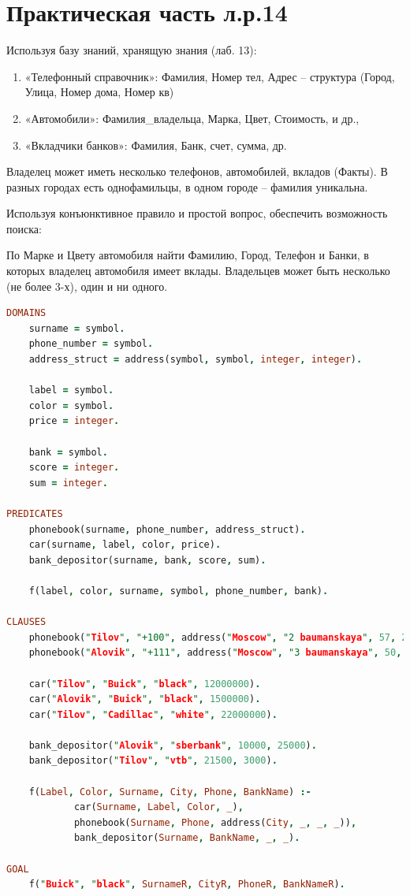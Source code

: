 \documentclass[a4paper,oneside,12pt]{extreport}
\begin{document}
\newpage

\section*{Практическая часть л.р.14}

\begin{task}
    Используя базу знаний, хранящую знания (лаб. 13):
    \begin{enumerate}
        \item «Телефонный справочник»: Фамилия, Номер  тел, Адрес – структура (Город, Улица, Номер дома, Номер кв)
        \item «Автомобили»: Фамилия\_владельца, Марка, Цвет, Стоимость, и др.,
        \item «Вкладчики банков»: Фамилия, Банк, счет, сумма, др.
    \end{enumerate}
    Владелец может иметь несколько телефонов, автомобилей, вкладов (Факты).
    В разных городах есть однофамильцы, в одном городе – фамилия уникальна.

    Используя конъюнктивное правило и простой вопрос, обеспечить возможность
    поиска:

    По Марке и Цвету автомобиля найти Фамилию, Город, Телефон и Банки, в которых
    владелец автомобиля имеет вклады.
    Владельцев может быть несколько (не более 3-х), один и ни одного.
    \begin{lstlisting}[language=Prolog]
DOMAINS 
    surname = symbol.
    phone_number = symbol.
    address_struct = address(symbol, symbol, integer, integer).

    label = symbol.
    color = symbol.
    price = integer.
    
    bank = symbol.
    score = integer.
    sum = integer.

PREDICATES
    phonebook(surname, phone_number, address_struct).
    car(surname, label, color, price).
    bank_depositor(surname, bank, score, sum).
    
    f(label, color, surname, symbol, phone_number, bank).

CLAUSES
    phonebook("Tilov", "+100", address("Moscow", "2 baumanskaya", 57, 25)).
    phonebook("Alovik", "+111", address("Moscow", "3 baumanskaya", 50, 75)).
    
    car("Tilov", "Buick", "black", 12000000).
    car("Alovik", "Buick", "black", 1500000).
    car("Tilov", "Cadillac", "white", 22000000).
    
    bank_depositor("Alovik", "sberbank", 10000, 25000).
    bank_depositor("Tilov", "vtb", 21500, 3000).
    
    f(Label, Color, Surname, City, Phone, BankName) :- 
            car(Surname, Label, Color, _), 
            phonebook(Surname, Phone, address(City, _, _, _)),
            bank_depositor(Surname, BankName, _, _).
    
GOAL
    f("Buick", "black", SurnameR, CityR, PhoneR, BankNameR).       
    \end{lstlisting}
\end{task}
\end{document}
